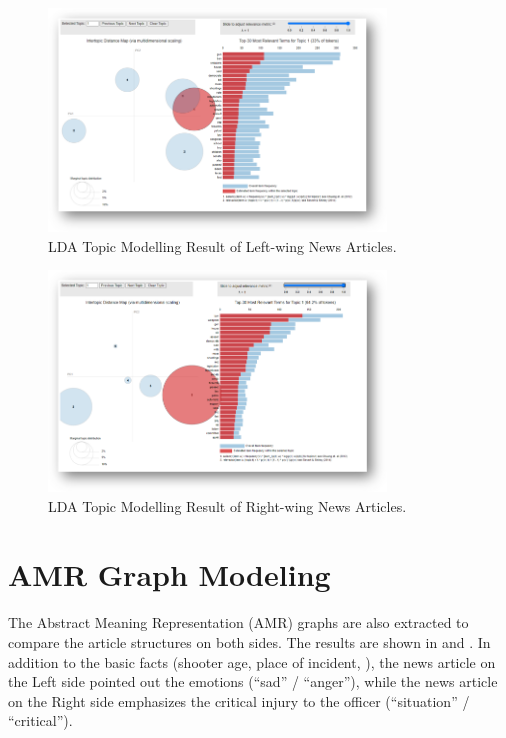 \begin{figure}[ht]
    \centering
    \includegraphics[width=0.8\textwidth]{img/empirical-lda-left}
    \caption{LDA Topic Modelling Result of Left-wing News Articles.}
    \label{fig:empirical-lda-left}
\end{figure}
\begin{figure}[ht]
    \centering
    \includegraphics[width=0.8\textwidth]{img/empirical-lda-right}
    \caption{LDA Topic Modelling Result of Right-wing News Articles.}
    \label{fig:empirical-lda-right}
\end{figure}

\section{AMR Graph Modeling}
\label{empirical-amr}
The Abstract Meaning Representation (AMR) graphs are also extracted to compare the article structures on both sides. The results are shown in  and . In addition to the basic facts (shooter age, place of incident, \etc), the news article on the Left side pointed out the emotions (``sad'' / ``anger''), while the news article on the Right side emphasizes the critical injury to the officer (``situation'' / ``critical'').


